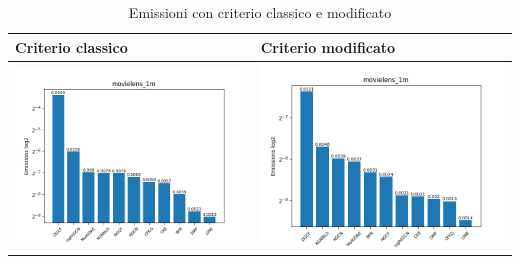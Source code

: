 \begin{table}[H]
    \centering
    \footnotesize
    \setlength\tabcolsep{0pt}
    \begin{tabularx}{\textwidth}{|X|X|}
        \hline
        \textbf{Criterio classico} & \textbf{Criterio modificato} \\
        \hline
        \includegraphics[width=\linewidth, trim=0 0 0 0]{images/emissions_movielens_1m_30_6_earlyClassic.png} &
        \includegraphics[width=\linewidth, trim=0 0 0 0]{images/emissions_movielens_1m_30_6_earlyModified.png} \\
        \hline
    \end{tabularx}
    \caption{Emissioni con criterio classico e modificato}
    \label{tab:emissions_info}
\end{table}



